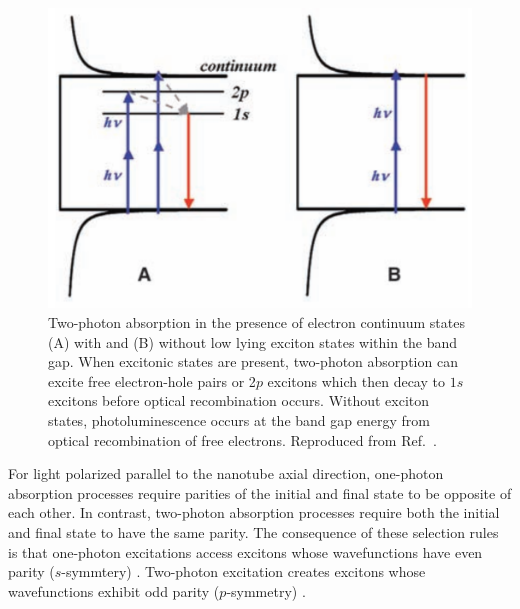 \begin{figure}[ht]
	\centering
	\includegraphics[scale=0.3]{images/chapter_optical_props/cnt_two_photon}
	\caption{ Two-photon absorption in the presence of electron continuum states (A) with and (B) without low lying exciton states within the band gap. When excitonic states are present, two-photon absorption can excite free electron-hole pairs or 2$p$ excitons which then decay to $1s$ excitons before optical recombination occurs. Without exciton states, photoluminescence occurs at the band gap energy from optical recombination of free electrons. Reproduced from Ref.\ \cite{wang2005optical}. }
	\label{fig:cnt_two_photon}
\end{figure}

For light polarized parallel to the nanotube axial direction, one-photon absorption processes require parities of the initial and final state to be opposite of each other. In contrast, two-photon absorption processes require both the initial and final state to have the same parity. The consequence of these selection rules is that one-photon excitations access excitons whose wavefunctions have even parity ($s$-symmtery) \cite{wang2005optical}. Two-photon excitation creates excitons whose wavefunctions exhibit odd parity ($p$-symmetry) \cite{wang2005optical}.


